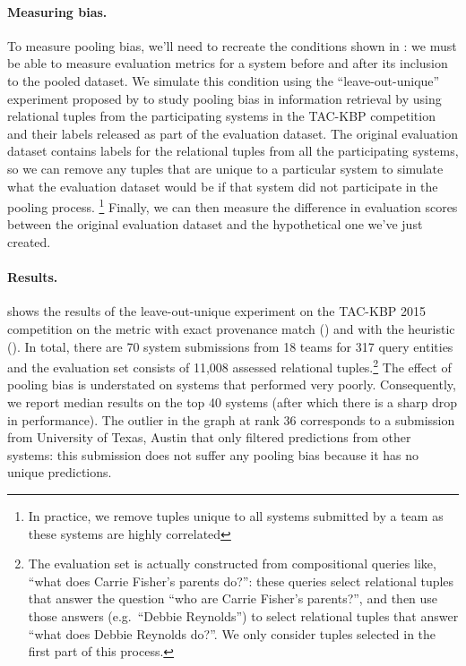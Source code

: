 \paragraph{Measuring bias.}
To measure pooling bias, we'll need to recreate the conditions shown in : we must be able to measure evaluation metrics for a system before and after its inclusion to the pooled dataset. 
We simulate this condition using the ``leave-out-unique'' experiment proposed by \citet{zobel1998reliable} to study pooling bias in information retrieval by using relational tuples from the participating systems in the TAC-KBP competition and their labels released as part of the evaluation dataset.
The original evaluation dataset contains labels for the relational tuples from all the participating systems, so we can remove any tuples that are unique to a particular system to simulate what the evaluation dataset would be if that system did not participate in the pooling process. \footnote{In practice, we remove tuples unique to all systems submitted by a team as these systems are highly correlated} 
Finally, we can then measure the difference in evaluation scores between the original evaluation dataset and the hypothetical one we've just created.

\paragraph{Results.}
 shows the results of the leave-out-unique experiment on the TAC-KBP 2015 competition on the \fone{} metric with exact provenance match () and with the \anydoc{} heuristic ().
In total, there are 70 system submissions from 18 teams for 317 query entities and the evaluation set consists of 11,008 assessed relational tuples.\footnote{%
  The evaluation set is actually constructed from compositional queries like, ``what does Carrie Fisher's parents do?'':
  these queries select relational tuples that answer the question ``who are Carrie Fisher's parents?'', and then use those answers (e.g.\ ``Debbie Reynolds'') to select relational tuples that answer ``what does Debbie Reynolds do?''.
  We only consider tuples selected in the first part of this process.
}
The effect of pooling bias is understated on systems that performed very poorly.
Consequently, we report median results on the top 40 systems (after which there is a sharp drop in performance).
The outlier in the graph at rank 36 corresponds to a submission from University of Texas, Austin that only filtered predictions from other systems: this submission does not suffer any pooling bias because it has no unique predictions.

